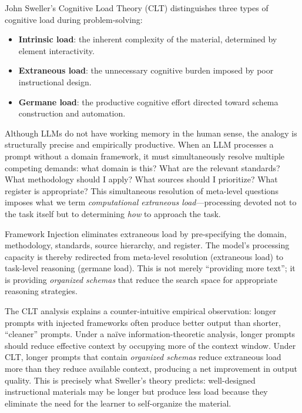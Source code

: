 \documentclass[12pt,a4paper]{article}
\begin{document}
John Sweller's Cognitive Load Theory (CLT) \cite{sweller1988} distinguishes three types of cognitive load during problem-solving:

\begin{itemize}
  \item \textbf{Intrinsic load}: the inherent complexity of the material, determined by element interactivity.
  \item \textbf{Extraneous load}: the unnecessary cognitive burden imposed by poor instructional design.
  \item \textbf{Germane load}: the productive cognitive effort directed toward schema construction and automation.
\end{itemize}

Although LLMs do not have working memory in the human sense, the analogy is structurally precise and empirically productive. When an LLM processes a prompt without a domain framework, it must simultaneously resolve multiple competing demands: what domain is this? What are the relevant standards? What methodology should I apply? What sources should I prioritize? What register is appropriate? This simultaneous resolution of meta-level questions imposes what we term \emph{computational extraneous load}---processing devoted not to the task itself but to determining \emph{how} to approach the task.

Framework Injection eliminates extraneous load by pre-specifying the domain, methodology, standards, source hierarchy, and register. The model's processing capacity is thereby redirected from meta-level resolution (extraneous load) to task-level reasoning (germane load). This is not merely ``providing more text''; it is providing \emph{organized schemas} that reduce the search space for appropriate reasoning strategies.

The CLT analysis explains a counter-intuitive empirical observation: longer prompts with injected frameworks often produce better output than shorter, ``cleaner'' prompts. Under a na\"ive information-theoretic analysis, longer prompts should reduce effective context by occupying more of the context window. Under CLT, longer prompts that contain \emph{organized schemas} reduce extraneous load more than they reduce available context, producing a net improvement in output quality. This is precisely what Sweller's theory predicts: well-designed instructional materials may be longer but produce less load because they eliminate the need for the learner to self-organize the material.
\end{document}
